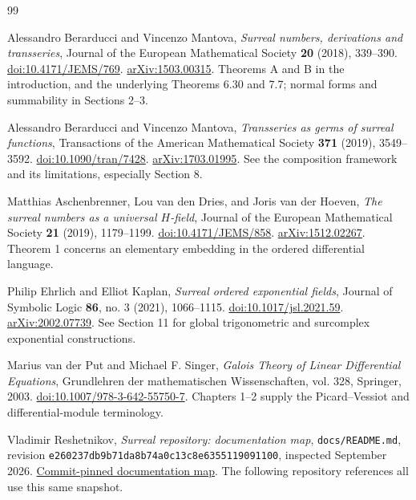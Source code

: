 \documentclass[11pt,a4paper]{article}
\numberwithin{equation}{section}
\theoremstyle{definition}
\theoremstyle{remark}
\begin{document}
\clearpage
{}
{}
\begin{thebibliography}{99}\small\raggedright
{}
Alessandro Berarducci and Vincenzo Mantova,
\emph{Surreal numbers, derivations and transseries},
Journal of the European Mathematical Society \textbf{20} (2018), 339--390.
\href{https://doi.org/10.4171/JEMS/769}{doi:10.4171/JEMS/769}.
\href{https://arxiv.org/abs/1503.00315}{arXiv:1503.00315}.
Theorems A and B in the introduction, and the underlying Theorems 6.30
and 7.7; normal forms and summability in Sections 2--3.

Alessandro Berarducci and Vincenzo Mantova,
\emph{Transseries as germs of surreal functions},
Transactions of the American Mathematical Society \textbf{371} (2019),
3549--3592.
\href{https://doi.org/10.1090/tran/7428}{doi:10.1090/tran/7428}.
\href{https://arxiv.org/abs/1703.01995}{arXiv:1703.01995}.
See the composition framework and its limitations, especially Section 8.

Matthias Aschenbrenner, Lou van den Dries, and Joris van der Hoeven,
\emph{The surreal numbers as a universal $H$-field},
Journal of the European Mathematical Society \textbf{21} (2019), 1179--1199.
\href{https://doi.org/10.4171/JEMS/858}{doi:10.4171/JEMS/858}.
\href{https://arxiv.org/abs/1512.02267}{arXiv:1512.02267}.
Theorem 1 concerns an elementary embedding in the ordered differential
language.

Philip Ehrlich and Elliot Kaplan,
\emph{Surreal ordered exponential fields},
Journal of Symbolic Logic \textbf{86}, no. 3 (2021), 1066--1115.
\href{https://doi.org/10.1017/jsl.2021.59}{doi:10.1017/jsl.2021.59}.
\href{https://arxiv.org/abs/2002.07739}{arXiv:2002.07739}.
See Section 11 for global trigonometric and surcomplex exponential
constructions.

Marius van der Put and Michael F. Singer,
\emph{Galois Theory of Linear Differential Equations},
Grundlehren der mathematischen Wissenschaften, vol. 328, Springer, 2003.
\href{https://doi.org/10.1007/978-3-642-55750-7}{doi:10.1007/978-3-642-55750-7}.
Chapters 1--2 supply the Picard--Vessiot and differential-module terminology.

Vladimir Reshetnikov, \emph{Surreal repository: documentation map},
\texttt{docs/README.md}, revision
\texttt{e260237db9b71da8b74a0c13c8e6355119091100}, inspected September 2026.
\href{https://github.com/VladimirReshetnikov/Surreal/blob/e260237db9b71da8b74a0c13c8e6355119091100/docs/README.md}{Commit-pinned documentation map}.
The following repository references all use this same snapshot.


\end{thebibliography}
\end{document}
